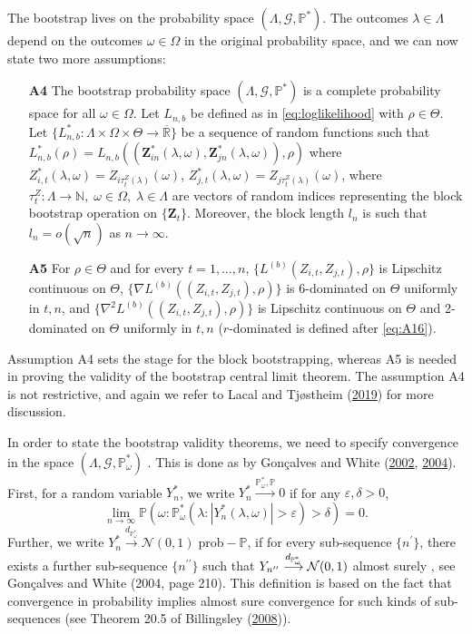 \documentclass[
  12pt,
  letterpaper]{article}
\numberwithin{equation}{section}
\newcommand{\Z}{\bm{Z}}
\begin{document}
The bootstrap lives on the probability space \((\Lambda, \mathcal{G}, \mathbb{P}^*)\). The outcomes \(\lambda \in \Lambda\) depend on the outcomes \(\omega \in \Omega\) in the original probability space, and we can now state two more assumptions:

\begin{itemize}
\item[\textbf{A4}] The bootstrap probability space $(\Lambda, \mathcal{G}, \mathbb{P}^*)$ is a complete probability space for all $\omega \in \Omega$. Let $L_{n,b}$ be defined as in \eqref{eq:loglikelihood} with $\rho \in \Theta$. Let $\{L^*_{n,b}: \Lambda\times\Omega\times\Theta \rightarrow \overline{\mathbb{R}}\}$ be a sequence of random functions such that $L_{n,b}^*(\rho) = L_{n,b}((\Z_{in}^{*}(\lambda,\omega),\Z_{jn}^*(\lambda,\omega)),\rho)$ where $Z_{i,t}^*(\lambda,\omega) = Z_{i\tau_t^{Z}(\lambda)}(\omega)$, $Z_{j,t}^*(\lambda,\omega)= Z_{j\tau_t^{Z}(\lambda)}(\omega)$, where $\tau_t^{Z}: \Lambda \to \mathbb{N},\; \omega \in \Omega, \; \lambda \in \Lambda$ are vectors of random indices representing the block bootstrap operation on $\{\Z_t\}$. Moreover, the block length $l_n$ is such that $l_n=o(\sqrt{n})$ as $n \to \infty$. 
\item[\textbf{A5}] For $\rho \in \Theta$ and for every $t=1,\ldots,n$, $\{L^{(b)}(Z_{i,t},Z_{j,t}),\rho\}$ is Lipschitz continuous on $\Theta$, $\{\nabla L^{(b)}((Z_{i,t},Z_{j,t}),\rho)\}$ is 6-dominated  on $\Theta$ uniformly in $t,n$, and $\{\nabla^2 L^{(b)}((Z_{i,t},Z_{j,t}),\rho)\}$ is Lipschitz continuous on $\Theta$ and 2-dominated on $\Theta$ uniformly in $t,n$ ($r$-dominated is defined after \eqref{eq:A16}).
\end{itemize}

Assumption A4 sets the stage for the block bootstrapping, whereas A5 is needed in proving the validity of the bootstrap central limit theorem. The assumption A4 is not restrictive, and again we refer to Lacal and Tjøstheim (\protect\hyperlink{ref-lacal2018estimating}{2019}) for more discussion.

In order to state the bootstrap validity theorems, we need to specify convergence in the space \((\Lambda, {\mathcal G}, \mathbb{P}_{\omega}^*)\) . This is done as by Gon\c{c}alves and White (\protect\hyperlink{ref-gonccalves2002bootstrap}{2002}, \protect\hyperlink{ref-gonccalves2004maximum}{2004}). First, for a random variable \(Y_n^*\), we write \(Y_n^* \stackrel {\mathbb{P}_{\omega}^*,\mathbb{P}}{\rightarrow} 0\) if for any \(\varepsilon, \delta > 0\),
\[
\lim_{n \to \infty} \mathbb{P}(\omega:\mathbb{P}_{\omega}^*(\lambda:|Y_n^*(\lambda,\omega)| > \varepsilon) > \delta) = 0.
\]
Further, we write \(Y_n^* \stackrel {d_{\mathbb{P}_{\omega}^*}}{\longrightarrow} {\mathcal N}(0,1)\;\mbox{prob}-\mathbb{P}\), if for every sub-sequence \(\{n^{\prime}\}\), there exists a further sub-sequence \(\{n^{\prime \prime}\}\) such that \(Y_{n^{\prime \prime}} \stackrel {d_{\mathbb{P}_{\omega}^{*}}} {\longrightarrow} {\cal N}(0,1)\) almost surely , see Gon\c{c}alves and White (2004, page 210). This definition is based on the fact that convergence in probability implies almost sure convergence for such kinds of sub-sequences (see Theorem 20.5 of Billingsley (\protect\hyperlink{ref-bill:2008}{2008})).
\end{document}
